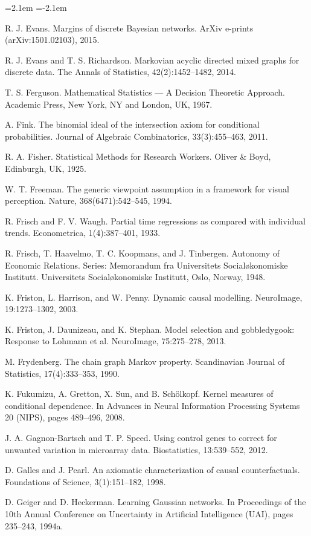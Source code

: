 \begin{list}{}{\leftmargin=2.1em
 \itemindent=-2.1em\parsep=0pt\itemsep=3pt}
\item R. J. Evans. Margins of discrete Bayesian networks. ArXiv e-prints (arXiv:1501.02103), 2015.
\item R. J. Evans and T. S. Richardson. Markovian acyclic directed mixed graphs for discrete data. The Annals of Statistics, 42(2):1452--1482, 2014.
\item T. S. Ferguson. Mathematical Statistics --- A Decision Theoretic Approach. Academic Press, New York, NY and London, UK, 1967.
\item A. Fink. The binomial ideal of the intersection axiom for conditional probabilities. Journal of Algebraic Combinatorics, 33(3):455--463, 2011.
\item R. A. Fisher. Statistical Methods for Research Workers. Oliver \& Boyd, Edinburgh, UK, 1925.
\item W. T. Freeman. The generic viewpoint assumption in a framework for visual perception. Nature, 368(6471):542--545, 1994.
\item R. Frisch and F. V. Waugh. Partial time regressions as compared with individual trends. Econometrica, 1(4):387--401, 1933.
\item R. Frisch, T. Haavelmo, T. C. Koopmans, and J. Tinbergen. Autonomy of Economic Relations. Series: Memorandum fra Universitets Socialøkonomiske Institutt. Universitets Socialøkonomiske Institutt, Oslo, Norway, 1948.
\item K. Friston, L. Harrison, and W. Penny. Dynamic causal modelling. NeuroImage, 19:1273--1302, 2003.
\item K. Friston, J. Daunizeau, and K. Stephan. Model selection and gobbledygook: Response to Lohmann et al. NeuroImage, 75:275--278, 2013.
\item M. Frydenberg. The chain graph Markov property. Scandinavian Journal of Statistics, 17(4):333--353, 1990.
\item K. Fukumizu, A. Gretton, X. Sun, and B. Schölkopf. Kernel measures of conditional dependence. In Advances in Neural Information Processing Systems 20 (NIPS), pages 489--496, 2008.
\item J. A. Gagnon-Bartsch and T. P. Speed. Using control genes to correct for unwanted variation in microarray data. Biostatistics, 13:539--552, 2012.
\item D. Galles and J. Pearl. An axiomatic characterization of causal counterfactuals. Foundations of Science, 3(1):151--182, 1998.
\item D. Geiger and D. Heckerman. Learning Gaussian networks. In Proceedings of the 10th Annual Conference on Uncertainty in Artificial Intelligence (UAI), pages 235--243, 1994a.

\end{list}
